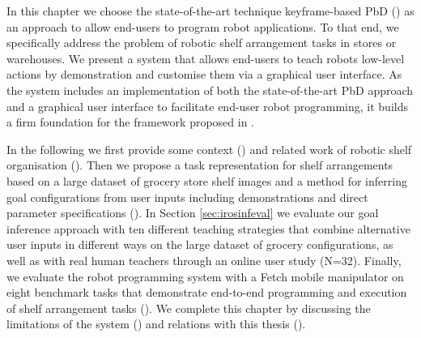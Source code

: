 In this chapter we choose the state-of-the-art technique keyframe-based PbD (\cite{akgun12klfd}) as an approach to allow end-users to program robot applications.
To that end, we specifically address the problem of robotic shelf arrangement tasks in stores or warehouses. 
We present a system that allows end-users to teach robots low-level actions by demonstration and customise them via a graphical user interface.
As the system includes an implementation of both the state-of-the-art PbD approach and a graphical user interface to facilitate end-user robot programming, it builds a firm foundation for the framework proposed in .

In the following we first provide some context () and related work of robotic shelf organisation ().
Then we propose a task representation for shelf arrangements based on a large dataset of grocery store shelf images and a method for inferring goal configurations from user inputs including demonstrations and direct parameter specifications ().
In Section \ref{sec:irosinfeval} we evaluate our goal inference approach with ten different teaching strategies that combine alternative user inputs in different ways on the large dataset of grocery configurations, as well as with real human teachers through an online user study (N=32).
Finally, we evaluate the robot programming system with a Fetch mobile manipulator on eight benchmark tasks that demonstrate end-to-end programming and execution of shelf arrangement tasks ().
We complete this chapter by discussing the limitations of the system () and relations with this thesis ().


